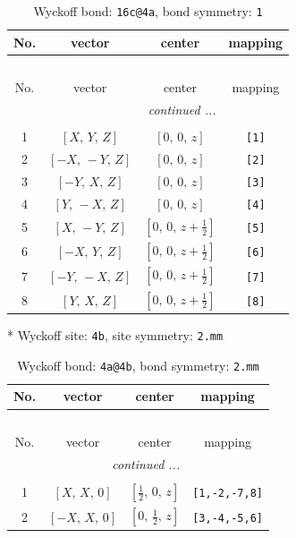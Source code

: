 \documentclass[fleqn,8pt]{jsarticle}
\begin{document}
\renewcommand{\arraystretch}{1.2}
\begin{longtable}{cccc}
\caption{Wyckoff bond: {\tt 16c@4a}, bond symmetry: {\tt 1}}
 \\
 \hline \hline
No. & vector & center & mapping \\ \hline \endfirsthead

\multicolumn{3}{l}{\tablename\ \thetable{}} \\
 \hline \hline
No. & vector & center & mapping \\ \hline \endhead

 \hline \hline
\multicolumn{3}{r}{\footnotesize\it continued ...} \\ \endfoot

 \hline \hline
\multicolumn{3}{r}{} \\ \endlastfoot

1 & $\left[ X,\, Y,\, Z \right]$ & $\left[ 0,\, 0,\, z \right]$ & {\tt [1]} \\ \hline
2 & $\left[ - X,\, - Y,\, Z \right]$ & $\left[ 0,\, 0,\, z \right]$ & {\tt [2]} \\ \hline
3 & $\left[ - Y,\, X,\, Z \right]$ & $\left[ 0,\, 0,\, z \right]$ & {\tt [3]} \\ \hline
4 & $\left[ Y,\, - X,\, Z \right]$ & $\left[ 0,\, 0,\, z \right]$ & {\tt [4]} \\ \hline
5 & $\left[ X,\, - Y,\, Z \right]$ & $\left[ 0,\, 0,\, z + \frac{1}{2} \right]$ & {\tt [5]} \\ \hline
6 & $\left[ - X,\, Y,\, Z \right]$ & $\left[ 0,\, 0,\, z + \frac{1}{2} \right]$ & {\tt [6]} \\ \hline
7 & $\left[ - Y,\, - X,\, Z \right]$ & $\left[ 0,\, 0,\, z + \frac{1}{2} \right]$ & {\tt [7]} \\ \hline
8 & $\left[ Y,\, X,\, Z \right]$ & $\left[ 0,\, 0,\, z + \frac{1}{2} \right]$ & {\tt [8]} \\
\end{longtable}
* Wyckoff site: {\tt 4b}, site symmetry: {\tt 2.mm}
\renewcommand{\arraystretch}{1.2}
\begin{longtable}{cccc}
\caption{Wyckoff bond: {\tt 4a@4b}, bond symmetry: {\tt 2.mm}}
 \\
 \hline \hline
No. & vector & center & mapping \\ \hline \endfirsthead

\multicolumn{3}{l}{\tablename\ \thetable{}} \\
 \hline \hline
No. & vector & center & mapping \\ \hline \endhead

 \hline \hline
\multicolumn{3}{r}{\footnotesize\it continued ...} \\ \endfoot

 \hline \hline
\multicolumn{3}{r}{} \\ \endlastfoot

1 & $\left[ X,\, X,\, 0 \right]$ & $\left[ \frac{1}{2},\, 0,\, z \right]$ & {\tt [1,-2,-7,8]} \\ \hline
2 & $\left[ - X,\, X,\, 0 \right]$ & $\left[ 0,\, \frac{1}{2},\, z \right]$ & {\tt [3,-4,-5,6]} \\
\end{longtable}
\end{document}
